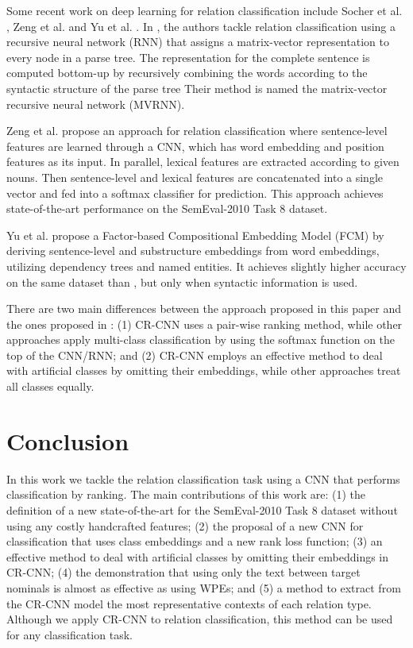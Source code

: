 \documentclass[11pt]{article}
\begin{document}
Some recent work on deep learning for relation classification include Socher et al. ,
Zeng et al. 
and Yu et al. .
In \cite{socher:2012:emnlp},
the authors tackle relation classification using a recursive neural network (RNN) that assigns a matrix-vector representation to every node in a parse tree.
The representation for the complete sentence is computed bottom-up by recursively combining the words according to the syntactic structure of the parse tree
Their method is named the matrix-vector recursive neural network (MVRNN).

Zeng et al.  propose an approach for relation classification where sentence-level features are learned through a CNN, 
which has word embedding and position features as its input. In parallel, lexical features are extracted according to given nouns. 
Then sentence-level and lexical features are concatenated into a single vector and fed into a softmax classifier for prediction. 
This approach achieves state-of-the-art performance on the SemEval-2010 Task 8 dataset.

Yu et al.  propose a Factor-based Compositional Embedding Model (FCM) by deriving sentence-level and substructure embeddings from word embeddings, utilizing dependency trees and named entities. It achieves slightly higher accuracy on the same dataset than \cite{zeng2014:coling}, but only when syntactic information is used.

There are two main differences between the approach proposed in this paper and the ones proposed in \cite{socher:2012:emnlp,zeng2014:coling,yu2014}:
(1) CR-CNN uses a pair-wise ranking method, while other approaches apply multi-class classification by using the softmax function on the top of the CNN/RNN;
and (2) CR-CNN employs an effective method to deal with artificial classes by omitting their embeddings, 
while other approaches treat all classes equally.










 \section{Conclusion}
\label{sec:conclusion}
In this work we tackle the relation classification task using a CNN that performs classification by ranking.
The main contributions of this work are:
(1) the definition of a new state-of-the-art for the SemEval-2010 Task 8 dataset without using any costly handcrafted features;
(2) the proposal of a new CNN for classification that uses class embeddings and a new rank loss function;
(3) an effective method to deal with artificial classes by omitting their embeddings in CR-CNN;
(4) the demonstration that using only the text between target nominals is almost as effective as using WPEs; and
(5) a method to extract from the CR-CNN model the most representative contexts of each relation type.
Although we apply CR-CNN to relation classification, this method can be used for any classification task.
\end{document}
